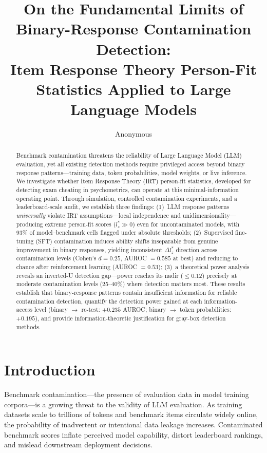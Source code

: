 \documentclass[11pt]{article}
\title{On the Fundamental Limits of Binary-Response Contamination Detection:\\Item Response Theory Person-Fit Statistics Applied to Large Language Models}
\author{Anonymous}
\date{}
\begin{document}
\maketitle

\begin{abstract}
Benchmark contamination threatens the reliability of Large Language Model (LLM) evaluation, yet all existing detection methods require privileged access beyond binary response patterns---training data, token probabilities, model weights, or live inference.
We investigate whether Item Response Theory (IRT) person-fit statistics, developed for detecting exam cheating in psychometrics, can operate at this minimal-information operating point.
Through simulation, controlled contamination experiments, and a leaderboard-scale audit, we establish three findings:
(1)~LLM response patterns \emph{universally} violate IRT assumptions---local independence and unidimensionality---producing extreme person-fit scores ($l_z^* \gg 0$) even for uncontaminated models, with 93\% of model--benchmark cells flagged under absolute thresholds;
(2)~Supervised fine-tuning (SFT) contamination induces ability shifts inseparable from genuine improvement in binary responses, yielding inconsistent $\Delta l_z^*$ direction across contamination levels (Cohen's $d = 0.25$, AUROC $= 0.585$ at best) and reducing to chance after reinforcement learning (AUROC $= 0.53$);
(3)~a theoretical power analysis reveals an inverted-U detection gap---power reaches its nadir ($\leq 0.12$) precisely at moderate contamination levels (25--40\%) where detection matters most.
These results establish that binary-response patterns contain insufficient information for reliable contamination detection, quantify the detection power gained at each information-access level (binary $\rightarrow$ re-test: $+0.235$ AUROC; binary $\rightarrow$ token probabilities: $+0.195$), and provide information-theoretic justification for gray-box detection methods.
\end{abstract}

\section{Introduction}

Benchmark contamination---the presence of evaluation data in model training corpora---is a growing threat to the validity of LLM evaluation.
As training datasets scale to trillions of tokens and benchmark items circulate widely online, the probability of inadvertent or intentional data leakage increases.
Contaminated benchmark scores inflate perceived model capability, distort leaderboard rankings, and mislead downstream deployment decisions.
\end{document}
